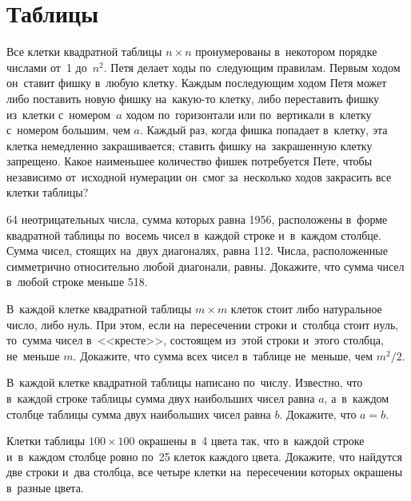 
\section*{Таблицы}


\begin{problems}

\item
Все клетки квадратной таблицы $n \times n$ пронумерованы в~некотором порядке
числами от~1 до~$n^2$.
Петя делает ходы по~следующим правилам.
Первым ходом он~ставит фишку в~любую клетку.
Каждым последующим ходом Петя может либо поставить новую фишку на~какую-то
клетку, либо переставить фишку из~клетки с~номером~$a$ ходом по~горизонтали или
по~вертикали в~клетку с~номером большим, чем $a$.
Каждый раз, когда фишка попадает в~клетку, эта клетка немедленно закрашивается;
ставить фишку на~закрашенную клетку запрещено.
Какое наименьшее количество фишек потребуется Пете, чтобы независимо
от~исходной нумерации он~смог за~несколько ходов закрасить все клетки таблицы?

\item
64 неотрицательных числа, сумма которых равна 1956, расположены в~форме
квадратной таблицы по~восемь чисел в~каждой строке и~в~каждом столбце.
Сумма чисел, стоящих на~двух диагоналях, равна 112.
Числа, расположенные симметрично относительно любой диагонали, равны.
Докажите, что сумма чисел в~любой строке меньше 518.

\item
В~каждой клетке квадратной таблицы $m \times m$ клеток стоит либо натуральное
число, либо нуль.
При этом, если на~пересечении строки и~столбца стоит нуль, то~сумма чисел
в~<<кресте>>, состоящем из~этой строки и~этого столбца, не~меньше $m$.
Докажите, что сумма всех чисел в~таблице не~меньше, чем $m^2 / 2$.

\item
В~каждой клетке квадратной таблицы написано по~числу.
Известно, что в~каждой строке таблицы сумма двух наибольших чисел равна $a$,
а~в~каждом столбце таблицы сумма двух наибольших чисел равна $b$.
Докажите, что $a = b$.

\item
Клетки таблицы $100 \times 100$ окрашены в~4 цвета так, что в~каждой строке
и~в~каждом столбце ровно по~25 клеток каждого цвета.
Докажите, что найдутся две строки и~два столбца, все четыре клетки
на~пересечении которых окрашены в~разные цвета.


\end{problems}
